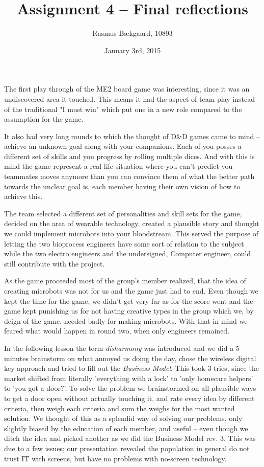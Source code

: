 \documentclass[oneside, 12pt]{article}
\title{Assignment 4 --  Final reflections}
\author{Rasmus Bækgaard, 10893}
\date{January 3rd, 2015}
\begin{document}
\maketitle

The first play through  of the ME2 board game was interesting, since it was an undiscovered area it touched. 
This means it had the aspect of team play instead of the traditional "I must win" which put one in a new role compared to the assumption for the game.

It also had very long rounds to which the thought of D\&D games came to mind -- achieve an unknown goal along with your companions. 
Each of you posses a different set of skills and you progress by rolling multiple dices. 
And with this is mind the game represent a real life situation where you can't predict you  teammates moves anymore than you can convince them of what the better path towards the unclear goal is, each member having their own vision of how to achieve this.

The team selected a different set of personalities and skill sets for the game, decided on the area of wearable technology, created a plausible story and thought we could implement microbots into your bloodstream. 
This served the purpose of letting the two bioprocess engineers have some sort of relation to the subject while the two electro engineers and the undersigned, Computer engineer, could still contribute with the project.

As the game proceeded most of the group's member realized, that the idea of creating microbots was not for us and the game just had to end.
Even though we kept the time for the game, we didn't get very far as for the score went and the game kept punishing us for not having creative types in the group which we, by deign of the game, needed badly for making microbots.
With that in mind we feared what would happen in round two, when only engineers remained.

In the following lesson the term \textit{disharmony} was introduced and we did a 5 minutes brainstorm on what annoyed us doing the day, chose the wireless digital key approach and tried to fill out the \textit{Business Model}.
This took 3 tries, since the market shifted from literally 'everything with a lock' to 'only homecare helpers' to 'you got a door?'. 
To solve the problem we brainstormed on all plausible ways to get a door open without actually touching it, and rate every idea by different criteria, then weigh each criteria and sum the weighs for the most wanted solution. 
We thought of this as a splendid way of solving our problems, only slightly biased by the education of each member, and useful -- even though we ditch the idea and picked another as we did the Business Model rev. 3.
This was due to a few issues; our presentation revealed the population in general do not trust IT with screens, but have no problems with no-screen technology.
\end{document}
